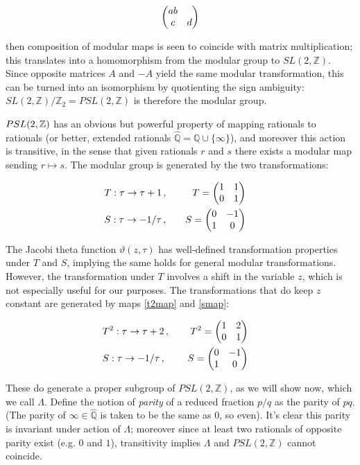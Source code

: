 \documentclass{article}
\begin{document}
\begin{equation*}
    \mqty( a  b \\ c & d)
\end{equation*}

then composition of modular maps is seen to coincide with matrix multiplication; this translates into a homomorphism from the modular group to $SL(2,\mathbb{Z})$. Since opposite matrices $A$ and $-A$ yield the same modular transformation, this can be turned into an isomorphism by quotienting the sign ambiguity: $SL(2,\mathbb{Z})/\mathbb{Z}_2 = PSL(2,\mathbb{Z})$ is therefore the modular group.

$PSL(2,\mathbb{Z})$ has an obvious but powerful property of mapping rationals to rationals (or better, extended rationals $\hat{\mathbb{Q}} = \mathbb{Q} \cup \{\infty\}$), and moreover this action is transitive, in the sense that given rationals $r$ and $s$ there exists a modular map sending $r\mapsto s$. The modular group is generated by the two transformations:

\begin{align*}
   & T : \tau \rightarrow \tau + 1\,, \quad& T=\mqty(1 & 1 \\ 0 & 1) && \\
   & S : \tau \rightarrow -1/\tau\,, \quad& S=\mqty(0 & -1 \\ 1 & 0) &&
\end{align*}

The Jacobi theta function $\vartheta(z,\tau)$ has well-defined transformation properties under $T$ and $S$, implying the same holds for general modular transformations. However, the transformation under $T$ involves a shift in the variable $z$, which is not especially useful for our purposes. The transformations that do keep $z$ constant are generated by maps \eqref{t2map} and \eqref{smap}:

\begin{align*}
   & T^2 : \tau \rightarrow \tau + 2\,, \quad& T^2=\mqty(1 & 2 \\ 0 & 1) && \\
   & S : \tau \rightarrow -1/\tau\,, \quad& S=\mqty(0 & -1 \\ 1 & 0) &&
\end{align*}

\newcommand{\emodg}{\Lambda}

These do generate a proper subgroup of $PSL(2,\mathbb{Z})$, as we will show now, which we call $\emodg$. Define the notion of \emph{parity} of a reduced fraction $p/q$ as the parity of $pq$. (The parity of $\infty \in \hat{\mathbb{Q}}$ is taken to be the same as $0$, so even). It's clear this parity is invariant under action of $\emodg$; moreover since at least two rationals of opposite parity exist (e.g. $0$ and $1$), transitivity implies $\emodg$ and $PSL(2,\mathbb{Z})$ cannot coincide.
\end{document}

